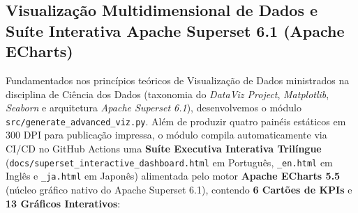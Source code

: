 \documentclass[12pt,a4paper]{article}
\begin{document}
\subsection{Visualização Multidimensional de Dados e Suíte Interativa Apache Superset 6.1 (Apache ECharts)}
Fundamentados nos princípios teóricos de Visualização de Dados ministrados na disciplina de Ciência dos Dados (taxonomia do \textit{DataViz Project}, \textit{Matplotlib}, \textit{Seaborn} e arquitetura \textit{Apache Superset 6.1}), desenvolvemos o módulo \texttt{src/generate\_advanced\_viz.py}. Além de produzir quatro painéis estáticos em 300 DPI para publicação impressa, o módulo compila automaticamente via CI/CD no GitHub Actions uma \textbf{Suíte Executiva Interativa Trilíngue} (\texttt{docs/superset\_interactive\_dashboard.html} em Português, \texttt{\_en.html} em Inglês e \texttt{\_ja.html} em Japonês) alimentada pelo motor \textbf{Apache ECharts 5.5} (núcleo gráfico nativo do Apache Superset 6.1), contendo \textbf{6 Cartões de KPIs} e \textbf{13 Gráficos Interativos}:
\end{document}
